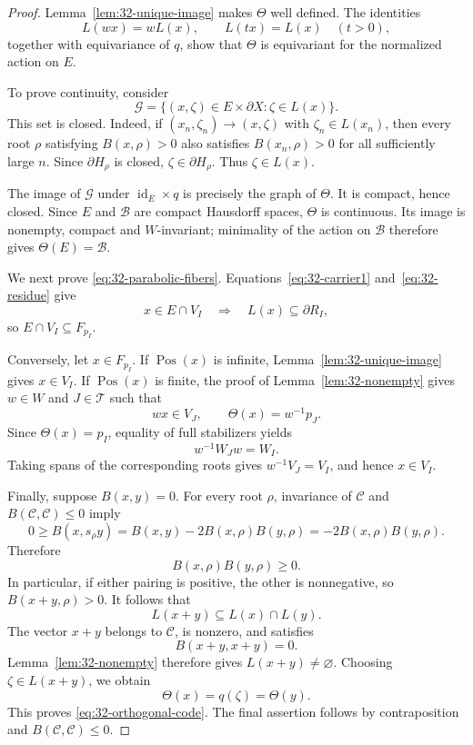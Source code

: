 \documentclass[11pt,reqno]{amsart}
\theoremstyle{plain}
\theoremstyle{definition}
\theoremstyle{remark}
\numberwithin{equation}{section}
\DeclareMathOperator{\Pos}{Pos}
\begin{document}
\begin{proof}
Lemma~\ref{lem:32-unique-image} makes $\Theta$ well defined.
The identities
\[
    L(wx)=wL(x),
    \qquad
    L(tx)=L(x)\quad(t>0),
\]
together with equivariance of $q$, show that $\Theta$ is
equivariant for the normalized action on $E$.

To prove continuity, consider
\[
    \mathscr G=
    \{(x,\zeta)\in E\times\partial X:\zeta\in L(x)\}.
\]
This set is closed. Indeed, if
$(x_n,\zeta_n)\to(x,\zeta)$ with $\zeta_n\in L(x_n)$,
then every root $\rho$ satisfying $B(x,\rho)>0$ also satisfies
$B(x_n,\rho)>0$ for all sufficiently large $n$.
Since $\partial H_\rho$ is closed, $\zeta\in\partial H_\rho$.
Thus $\zeta\in L(x)$.

The image of $\mathscr G$ under
$\operatorname{id}_E\times q$ is precisely the graph of $\Theta$.
It is compact, hence closed. Since $E$ and $\mathcal B$ are
compact Hausdorff spaces, $\Theta$ is continuous.
Its image is nonempty, compact and $W$-invariant;
minimality of the action on $\mathcal B$ therefore gives
$\Theta(E)=\mathcal B$.

We next prove \eqref{eq:32-parabolic-fibers}.
Equations~\eqref{eq:32-carrier1} and~\eqref{eq:32-residue}
give
\[
    x\in E\cap V_I
    \quad\Longrightarrow\quad
    L(x)\subseteq\partial R_I,
\]
so $E\cap V_I\subseteq F_{p_I}$.

Conversely, let $x\in F_{p_I}$.
If $\Pos(x)$ is infinite, Lemma~\ref{lem:32-unique-image}
gives $x\in V_I$.
If $\Pos(x)$ is finite, the proof of
Lemma~\ref{lem:32-nonempty} gives $w\in W$ and
$J\in\mathcal T$ such that
\[
    wx\in V_J,
    \qquad
    \Theta(x)=w^{-1}p_J.
\]
Since $\Theta(x)=p_I$, equality of full stabilizers yields
\[
    w^{-1}W_Jw=W_I.
\]
Taking spans of the corresponding roots gives
$w^{-1}V_J=V_I$, and hence $x\in V_I$.

Finally, suppose $B(x,y)=0$.
For every root $\rho$, invariance of $\mathcal C$ and
$B(\mathcal C,\mathcal C)\leq0$ imply
\[
    0\geq B(x,s_\rho y)
      =B(x,y)-2B(x,\rho)B(y,\rho)
      =-2B(x,\rho)B(y,\rho).
\]
Therefore
\[
    B(x,\rho)B(y,\rho)\geq0.
\]
In particular, if either pairing is positive, the other
is nonnegative, so $B(x+y,\rho)>0$. It follows that
\[
    L(x+y)\subseteq L(x)\cap L(y).
\]
The vector $x+y$ belongs to $\mathcal C$, is nonzero, and satisfies
\[
    B(x+y,x+y)=0.
\]
Lemma~\ref{lem:32-nonempty} therefore gives $L(x+y)\neq\varnothing$.
Choosing $\zeta\in L(x+y)$, we obtain
\[
    \Theta(x)=q(\zeta)=\Theta(y).
\]
This proves \eqref{eq:32-orthogonal-code}.
The final assertion follows by contraposition and
$B(\mathcal C,\mathcal C)\leq0$.
\end{proof}
\end{document}
